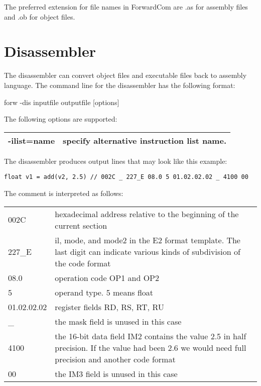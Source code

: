 \documentclass[forwardcom.tex]{subfiles}
\begin{document}
The preferred extension for file names in ForwardCom are .as for assembly files and .ob for object files.
\vv






\section{Disassembler} \label{disassembler}

The disassembler can convert object files and executable files back to assembly language.
The command line for the disassembler has the following format:

\vv
\hspace{5mm} {\ttfamily forw -dis inputfile outputfile [options]}

\vv
The following options are supported:\\
\begin{tabular}{|p{22mm}p{140mm}|}
\hline
-ilist=name & specify alternative instruction list name.\\
\hline
\end{tabular}
\vv

The disassembler produces output lines that may look like this example:

\begin{lstlisting}
float v1 = add(v2, 2.5) // 002C _ 227_E 08.0 5 01.02.02.02 _ 4100 00
\end{lstlisting}
\vv

The comment is interpreted as follows:\\
\vv

\begin{tabular}{|p{22mm}p{140mm}|}
\hline
002C & hexadecimal address relative to the beginning of the current section\\
227\_E  & il, mode, and mode2 in the E2 format template. The last digit can indicate various kinds of subdivision of the code format\\
08.0 & operation code OP1 and OP2\\
5    & operand type. 5 means float\\
01.02.02.02 & register fields RD, RS, RT, RU\\
\_   & the mask field is unused in this case\\
4100 & the 16-bit data field IM2 contains the value 2.5 in half precision. If the value had been 2.6 we would need full precision and another code format\\
00 & the IM3 field is unused in this case\\
\hline
\end{tabular}
\vspace{4mm}
\end{document}
